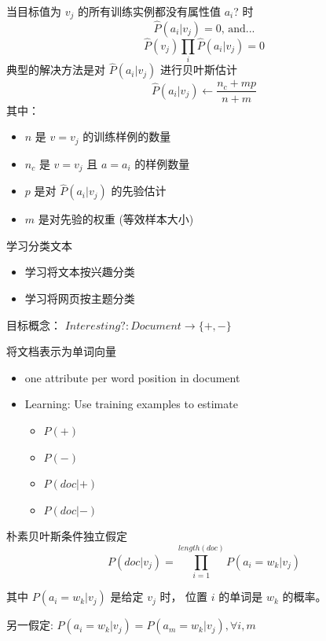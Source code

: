 \documentclass[presentation]{beamer}
\begin{document}
\begin{frame}[label={sec:orgce8f55c}]{当目标值为 \(v_j\) 的所有训练实例都没有属性值 \(a_i\)? 时}
$$\hat{P}(a_i|v_j) = 0 \mbox{, and...}$$
$$\hat{P}(v_{j}) \prod_{i} \hat{P}(a_{i} | v_{j}) = 0$$
典型的解决方法是对 \(\hat{P}(a_{i} | v_{j})\) 进行贝叶斯估计
   $$\hat{P}(a_{i} | v_{j}) \leftarrow \frac{n_{c} + mp}{n + m}$$
其中：
\begin{itemize}
\item \(n\) 是 \(v=v_j\) 的训练样例的数量
\item \(n_c\) 是 \(v=v_j\) 且 \(a=a_i\) 的样例数量
\item \(p\) 是对 \(\hat{P}(a_{i} | v_{j})\) 的先验估计
\item \(m\) 是对先验的权重 (等效样本大小)
\end{itemize}
\end{frame}

\begin{frame}[label={sec:org53db20c}]{学习分类文本}
\begin{itemize}
\item 学习将文本按兴趣分类
\item 学习将网页按主题分类
\end{itemize}


目标概念： \(Interesting? : Document \rightarrow \{+,-\}\)
\end{frame}

\begin{frame}[label={sec:org17ddc0e}]{将文档表示为单词向量}
\begin{itemize}
\item one attribute per word position in document
\item Learning: Use training examples to estimate
\begin{itemize}
\item \(P(+)\)
\item \(P(-)\)
\item \(P(doc|+)\)
\item \(P(doc|-)\)
\end{itemize}
\end{itemize}
\end{frame}

\begin{frame}[label={sec:org3e7ea36}]{朴素贝叶斯条件独立假定}
$$P(doc|v_j) = \prod_{i=1}^{length(doc)} P(a_i=w_k | v_j)$$

其中 \(P(a_i=w_k| v_j)\) 是给定 \(v_j\) 时， 位置 \(i\) 的单词是 \(w_k\) 的概率。

另一假定: \(P(a_i=w_k|v_j) = P(a_m=w_k|v_j), \forall i,m\)
\end{frame}
\end{document}

